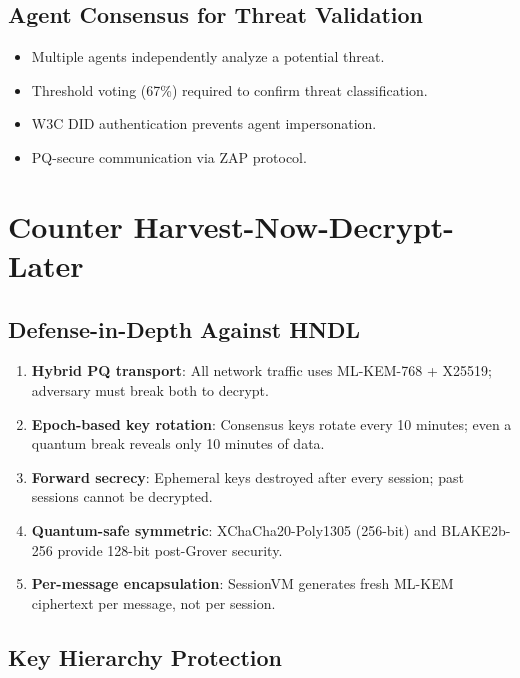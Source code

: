 \documentclass[11pt,letterpaper]{article}
\begin{document}
\subsection{Agent Consensus for Threat Validation}

\begin{itemize}
\item Multiple agents independently analyze a potential threat.
\item Threshold voting (67\%) required to confirm threat classification.
\item W3C DID authentication prevents agent impersonation.
\item PQ-secure communication via ZAP protocol.
\end{itemize}

\section{Counter Harvest-Now-Decrypt-Later}

\subsection{Defense-in-Depth Against HNDL}

\begin{enumerate}
\item \textbf{Hybrid PQ transport}: All network traffic uses ML-KEM-768 + X25519; adversary must break both to decrypt.
\item \textbf{Epoch-based key rotation}: Consensus keys rotate every 10 minutes; even a quantum break reveals only 10 minutes of data.
\item \textbf{Forward secrecy}: Ephemeral keys destroyed after every session; past sessions cannot be decrypted.
\item \textbf{Quantum-safe symmetric}: XChaCha20-Poly1305 (256-bit) and BLAKE2b-256 provide 128-bit post-Grover security.
\item \textbf{Per-message encapsulation}: SessionVM generates fresh ML-KEM ciphertext per message, not per session.
\end{enumerate}

\subsection{Key Hierarchy Protection}
\end{document}
